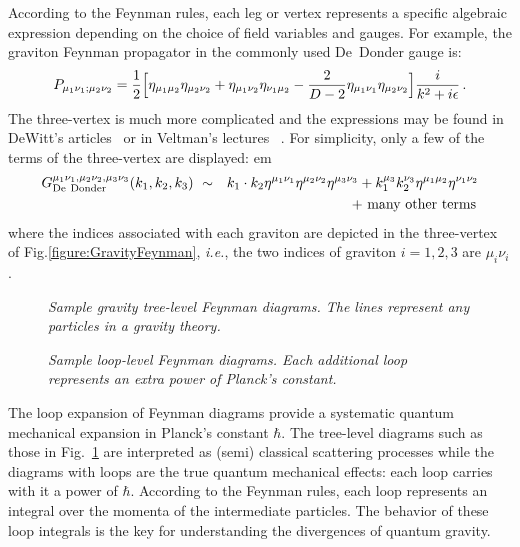 According to the Feynman rules, each leg or vertex represents 
a specific algebraic expression depending on the choice of field
variables and gauges. For example, the graviton Feynman propagator in the
commonly used De~Donder gauge is:
%
\begin{equation}
 P_{\mu_1 \nu_1 ; \mu_2 \nu_2} = 
 {1 \over 2} 
\Bigl[\eta_{\mu_1\mu_2} \eta_{\mu_2 \nu_2} 
+ \eta_{\mu_1\nu_2} \eta_{\nu_1\mu_2} 
- {2\over D-2} \eta_{\mu_1\nu_1} \eta_{\mu_2 \nu_2} \Bigr] 
{i\over k^2 + i\epsilon}\,. 
\label{GravityPropagator}
\end{equation}
%
The three-vertex is much more complicated and the expressions
may be found in DeWitt's articles~\cite{DeWitt67A,DeWitt67B} or in 
Veltman's lectures~\cite{VeltmanGravity} .  For simplicity,
only a few of the terms of the three-vertex are displayed: 
%
 em
\begin{eqnarray}
G_{\rm De\ Donder}^{\mu_1 \nu_1,\mu_2\nu_2,\mu_3\nu_3}(k_1,k_2,k_3)\ &\sim&
k_1 \cdot k_2 \eta^{\mu_1\nu_1}\eta^{\mu_2\nu_2}\eta^{\mu_3\nu_3} +
k_1^{\mu_3}k_2^{\nu_3}\eta^{\mu_1\mu_2}\eta^{\nu_1\nu_2} \nonumber\\
&& \hskip 2 cm 
\ +\ \hbox{many other terms}\,
\label{ThreeDeDonder}
\end{eqnarray}
%
where the indices associated with each graviton are depicted in the
three-vertex of Fig.\ref{figure:GravityFeynman}, {\it i.e.}, the two
indices of graviton $i=1,2,3$ are $\mu_i \nu_i$.



\begin{figure}[h]
  \def\epsfsize#1#2{.5#1}
  \centerline{}
  \caption{\it Sample gravity tree-level Feynman diagrams. The lines 
  represent any particles in a gravity theory.}
  \label{figure:GravityTrees}
\end{figure}


\begin{figure}[h]
  \def\epsfsize#1#2{.5#1}
  \centerline{}
  \caption{\it Sample loop-level Feynman diagrams. Each additional loop 
      represents an extra power of Planck's constant.}
  \label{figure:GravityLoops}
\end{figure}

The loop expansion of Feynman diagrams provide a systematic quantum
mechanical expansion in Planck's constant $\hbar$.  The tree-level
diagrams such as those in Fig.~\ref{figure:GravityTrees} are
interpreted as (semi) classical scattering processes while the
diagrams with loops are the true quantum mechanical effects: each loop
carries with it a power of $\hbar$.  According to the Feynman rules,
each loop represents an integral over the momenta of the intermediate
particles.  The behavior of these loop integrals is the key for
understanding the divergences of quantum gravity.

